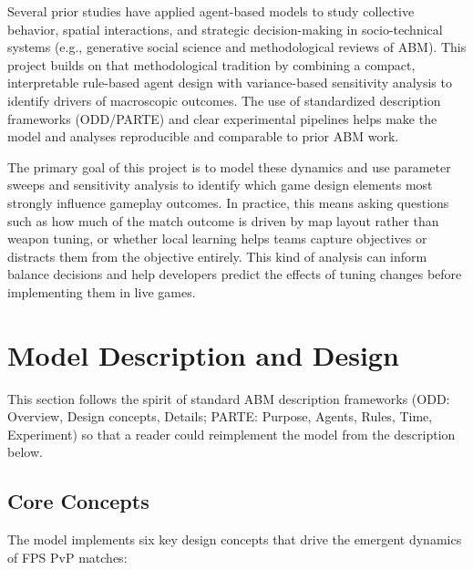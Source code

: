 \documentclass{assignment}
\begin{document}
Several prior studies have applied agent-based models to study collective behavior, spatial interactions, and strategic decision-making in socio-technical systems (e.g., generative social science and methodological reviews of ABM). This project builds on that methodological tradition by combining a compact, interpretable rule-based agent design with variance-based sensitivity analysis to identify drivers of macroscopic outcomes. The use of standardized description frameworks (ODD/PARTE) and clear experimental pipelines helps make the model and analyses reproducible and comparable to prior ABM work.

The primary goal of this project is to model these dynamics and use parameter sweeps and sensitivity analysis to identify which game design elements most strongly influence gameplay outcomes. In practice, this means asking questions such as how much of the match outcome is driven by map layout rather than weapon tuning, or whether local learning helps teams capture objectives or distracts them from the objective entirely. This kind of analysis can inform balance decisions and help developers predict the effects of tuning changes before implementing them in live games.

\section{Model Description and Design}

This section follows the spirit of standard ABM description frameworks (ODD: Overview, Design concepts, Details; PARTE: Purpose, Agents, Rules, Time, Experiment) so that a reader could reimplement the model from the description below.

\subsection{Core Concepts}

The model implements six key design concepts that drive the emergent dynamics of FPS PvP matches:
\end{document}
